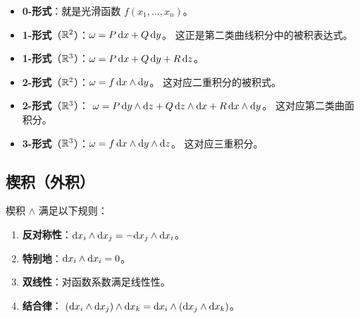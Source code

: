 \documentclass{article}
\begin{document}
\begin{remark}[常见低次形式]
  \begin{itemize}
    \item \textbf{0-形式}：就是光滑函数 $f(x_1, \ldots, x_n)$。
    \item \textbf{1-形式}（$\mathbb{R}^2$）：$\omega = P\,\mathrm{d} x + Q\,\mathrm{d} y$。
      这正是第二类曲线积分中的被积表达式。
    \item \textbf{1-形式}（$\mathbb{R}^3$）：$\omega = P\,\mathrm{d} x + Q\,\mathrm{d} y + R\,\mathrm{d} z$。
    \item \textbf{2-形式}（$\mathbb{R}^2$）：$\omega = f\,\mathrm{d} x \wedge \mathrm{d} y$。
      这对应二重积分的被积式。
    \item \textbf{2-形式}（$\mathbb{R}^3$）：
      $\omega = P\,\mathrm{d} y \wedge \mathrm{d} z + Q\,\mathrm{d} z \wedge \mathrm{d} x +
      R\,\mathrm{d} x \wedge \mathrm{d} y$。
      这对应第二类曲面积分。
    \item \textbf{3-形式}（$\mathbb{R}^3$）：$\omega = f\,\mathrm{d} x \wedge \mathrm{d} y
      \wedge \mathrm{d} z$。
      这对应三重积分。
  \end{itemize}
\end{remark}

\subsection{楔积（外积）}

\begin{definition}[楔积的运算规则]
  楔积 $\wedge$ 满足以下规则：
  \begin{enumerate}
    \item \textbf{反对称性}：$\mathrm{d} x_i \wedge \mathrm{d} x_j = -\mathrm{d} x_j \wedge \mathrm{d} x_i$。
    \item \textbf{特别地}：$\mathrm{d} x_i \wedge \mathrm{d} x_i = 0$。
    \item \textbf{双线性}：对函数系数满足线性性。
    \item \textbf{结合律}：
      $(\mathrm{d} x_i \wedge \mathrm{d} x_j) \wedge \mathrm{d} x_k
      = \mathrm{d} x_i \wedge (\mathrm{d} x_j \wedge \mathrm{d} x_k)$。
  \end{enumerate}
\end{definition}
\end{document}
